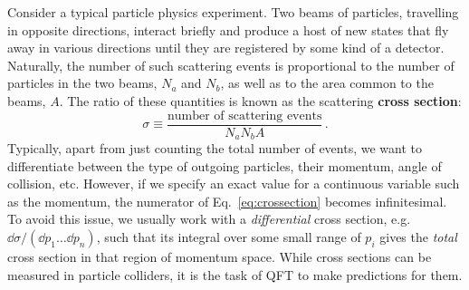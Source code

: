 \documentclass[main.tex]{subfiles}
\begin{document}
Consider a typical particle physics experiment. Two beams of particles, travelling in opposite directions, interact briefly and produce a host of new states that fly away in various directions until they are registered by some kind of a detector. Naturally, the number of such scattering events is proportional to the number of particles in the two beams, $N_a$ and $N_b$, as well as to the area common to the beams, $A$. The ratio of these quantities is known as the scattering \textbf{cross section}:
\begin{equation} \label{eq:crossection}
    \sigma \equiv \frac{\text{number of scattering events}}{N_a N_b A}\,.
\end{equation}
Typically, apart from just counting the total number of events, we want to differentiate between the type of outgoing particles, their momentum, angle of collision, etc. However, if we specify an exact value for a continuous variable such as the momentum, the numerator of Eq.~\ref{eq:crossection} becomes infinitesimal. To avoid this issue, we usually work with a \textit{differential} cross section, e.g. $\dd\sigma/(\dd p_1 \ldots \dd p_n)$, such that its integral over some small range of $p_i$ gives the \textit{total} cross section in that region of momentum space. While cross sections can be measured in particle colliders, it is the task of QFT to make predictions for them.
\end{document}
